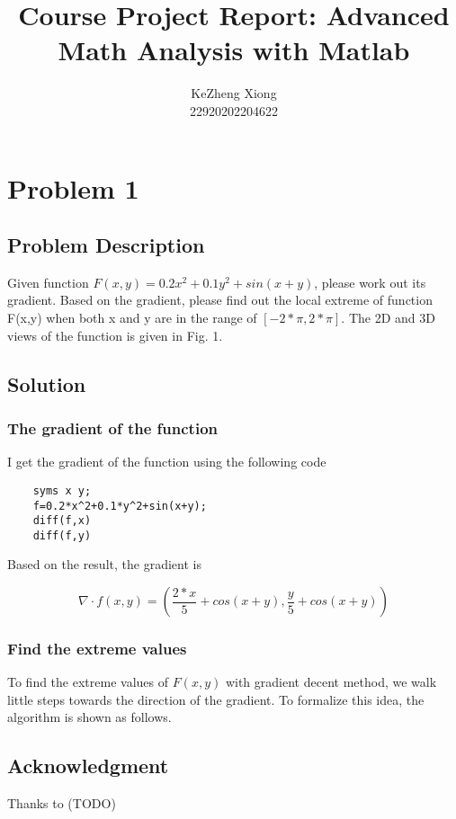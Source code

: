 \documentclass[12pt]{article}
\begin{document}
\title{Course Project Report: Advanced Math Analysis with Matlab}
\author{KeZheng Xiong \\ 22920202204622}

\maketitle


\tableofcontents

\pagebreak

\section{Problem 1}

\subsection{Problem Description}
Given function $F(x, y) = 0.2x^2 + 0.1y^2 + sin(x + y)$, please work out its
gradient. Based on the gradient, please find out the local extreme of function F(x,y)
when both x and y are in the range of $[-2*\pi, 2*\pi]$. The 2D and 3D views of the function
is given in Fig. 1. 

\subsection{Solution}

\subsubsection{The gradient of the function}

I get the gradient of the function using the following code

\begin{lstlisting}
	syms x y;
	f=0.2*x^2+0.1*y^2+sin(x+y);
	diff(f,x)
	diff(f,y)
\end{lstlisting}

Based on the result, the gradient is

\begin{equation}
	\nabla \cdot f(x,y)=( \frac{2*x}{5} + cos(x + y), \frac{y}{5} + cos(x + y))
\end{equation}

\subsubsection{Find the extreme values}
To find the extreme values of $F(x,y)$ with gradient decent method, we walk little steps towards the direction of the gradient. To formalize this idea, the algorithm is shown as follows.


\subsection{Acknowledgment}

Thanks to (TODO)
\end{document}
